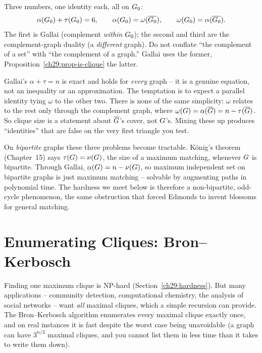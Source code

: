 \begin{focusbox}
Three numbers, one identity each, all on $G_0$:
\[
   \alpha(G_0)+\tau(G_0)=6,\qquad
   \alpha(G_0)=\omega(\overline{G_0}),\qquad
   \omega(G_0)=\alpha(\overline{G_0}).
\]
The first is Gallai (complement \emph{within} $G_0$); the second and third are
the complement-graph duality (a \emph{different} graph). Do not conflate ``the
complement of a set'' with ``the complement of a graph.'' Gallai uses the former,
Proposition~\ref{ch29:prop-is-clique} the latter.
\end{focusbox}

\begin{trapbox}
Gallai's $\alpha+\tau=n$ is exact and holds for \emph{every} graph -- it is a
genuine equation, not an inequality or an approximation. The temptation is to
expect a parallel identity tying $\omega$ to the other two. There is none of the
same simplicity: $\omega$ relates to the rest only through the complement graph,
where $\omega(G)=\alpha(\overline{G})=n-\tau(\overline{G})$. So clique
size is a statement about $\overline{G}$'s cover, not $G$'s. Mixing these
up produces ``identities'' that are false on the very first triangle you test.
\end{trapbox}

\begin{connectionbox}
On \emph{bipartite} graphs these three problems become tractable.
K\"onig's theorem (Chapter~15) says $\tau(G)=\nu(G)$,
the size of a maximum matching, whenever $G$ is bipartite. Through Gallai,
$\alpha(G)=n-\nu(G)$, so maximum independent set on bipartite graphs is
just maximum matching -- solvable by augmenting paths in polynomial time. The
hardness we meet below is therefore a non-bipartite, odd-cycle phenomenon, the
same obstruction that forced Edmonds to invent blossoms for general matching.
\end{connectionbox}

\section{Enumerating Cliques: Bron--Kerbosch}
\label{ch29:bron-kerbosch}

Finding one maximum clique is NP-hard (Section~\ref{ch29:hardness}). But many applications -- community detection, computational chemistry, the analysis of social networks -- want \emph{all} maximal cliques, which a simple recursion can provide. The Bron--Kerbosch algorithm enumerates every maximal
clique exactly once, and on real instances it is fast despite the worst case
being unavoidable (a graph can have $3^{n/3}$ maximal cliques, and you cannot
list them in less time than it takes to write them down).

